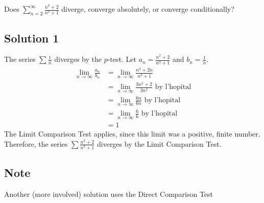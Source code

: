 \documentclass{article}
\begin{document}
\noindent
Does $\displaystyle \sum_{n=2}^\infty \frac{n^2+2}{n^3+1}$
diverge, converge absolutely, or converge conditionally?

\subsection*{Solution 1}

The series $\sum \frac1{n}$ diverges by the $p$-test. Let $a_n = \frac{n^2+2}{n^3+1}$ and $b_n = \frac1{n}$.
\begin{align*}
\lim_{n \to \infty} \frac{a_n}{b_n}
&= \lim_{n \to \infty} \frac{n^3+2n}{n^3+1}\\
&= \lim_{n \to \infty} \frac{3n^2+2}{3n^2} \text{ by l'hopital}\\
&= \lim_{n \to \infty} \frac{6n}{6n} \text{ by l'hopital}\\
&= \lim_{n \to \infty} \frac66 \text{ by l'hopital}\\
&= 1
\end{align*}
The Limit Comparison Test applies, since this limit was a positive, finite number. Therefore, the series $\sum \frac{n^2+2}{n^3+1}$ diverges by the Limit Comparison Test.

\subsection*{Note}
Another (more involved) solution uses the Direct Comparison Test
\end{document}
